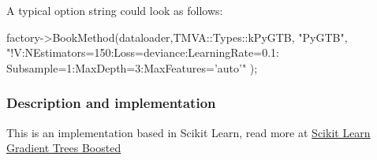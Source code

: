 
A typical option string could look as follows:
\begin{codeexample}
\begin{tmvacode}
factory->BookMethod(dataloader,TMVA::Types::kPyGTB, "PyGTB",
"!V:NEstimators=150:Loss=deviance:LearningRate=0.1:
Subsample=1:MaxDepth=3:MaxFeatures='auto'" );
\end{tmvacode}
\label{ce:PyGTBexample}
\end{codeexample}

\subsubsection{Description and implementation}
This is an implementation based in Scikit Learn,
read more at \href{http://scikit-learn.org/stable/modules/ensemble.html#gradient-boosting}{Scikit Learn Gradient Trees Boosted}

% 

% 

